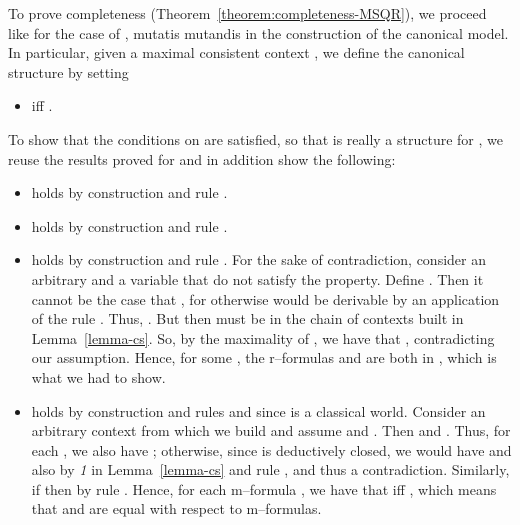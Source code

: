 \documentclass[times, 10pt]{article}
\begin{document}
\begin{figure*}[t]
To prove completeness (Theorem~\ref{theorem:completeness-MSQR}), we proceed like for the case
of , mutatis mutandis in the construction of the canonical model. In particular, given a 
maximal consistent context , we define the canonical structure
 by setting 
\begin{itemize}
\item  iff .
\end{itemize}
To show that the conditions on  are satisfied, so that  is really a structure
for , we reuse the results proved for  and in addition show the following:
\begin{itemize}
\item  holds by construction and rule .

\item  holds by construction 
and rule .

\item  holds by construction and rule 
. For the sake of contradiction, consider an arbitrary  and a variable  
that do not satisfy the property. Define . 
Then it cannot be the case that , for otherwise  would be derivable by an application of the rule . Thus, 
. But then  must be in the chain of contexts built in 
Lemma~\ref{lemma-cs}. So, by the maximality of , we have that 
, contradicting our assumption. Hence, for some , the r--formulas 
 and  are both in , which is what we had to show.

\item   holds by construction and
rules  and  since  is a classical world.
Consider an arbitrary context  from which we build  and assume
 and . Then  and 
. Thus, for each , we also have 
; otherwise, since  is deductively closed, we would have 
 and also  by \emph{1} in 
Lemma~\ref{lemma-cs} and rule , and thus a contradiction. Similarly, if 
 then  by rule . Hence, for each 
m--formula , we have that  iff , which
means that  and  are equal with respect to m--formulas. 


\end{itemize}
\end{figure*}
\end{document}
